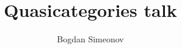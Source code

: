 \documentclass{article}
\title{Quasicategories talk}
\author{Bogdan Simeonov}
\date{}
\begin{document}




\newpage
\sloppy
\printbibliography
\end{document}
